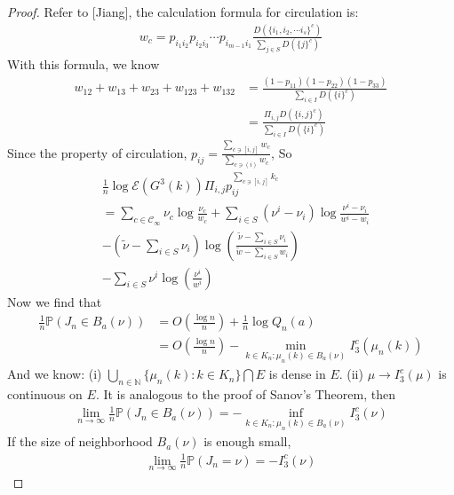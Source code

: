 \documentclass[11pt,en,cite=authoryear]{elegantpaper}
\begin{document}
\begin{proof}
    Refer to [Jiang], the calculation formula
    for circulation is:
    \begin{align*}
        w_c = p_{i_1 i_2} p_{i_2 i_3} \cdots p_{i_{m-1} i_1} \frac{D(\{i_1, i_2, \cdots i_s\}^c)}{\sum_{j\in S} D(\{j\}^c)}
    \end{align*}
    With this formula, we know
    \begin{align*}
        w_{12}+w_{13}+w_{23}+w_{123}+w_{132} &= \frac{(1-p_{11})(1-p_{22})(1-p_{33})}{\sum_{i\in I} D(\{i\}^c)} \\
        &= \frac{\Pi_{i, j} D(\{i, j\}^c)}{\sum_{i\in I} D(\{i\}^c)}
    \end{align*}
    Since the property of circulation, $p_{ij} = \frac{\sum_{c \ni [i,j]} w_c}{\sum_{c \ni (i)} w_c}$, So
    \begin{align*}
        &\frac{1}{n} \log \mathcal{E} (G^3(k)) \Pi_{i, j} p_{ij}^{\sum_{c \ni [i,j]} k_{c}} \\
        &= \sum_{c \in \mathcal{C}_{\infty}} \nu_{c} \log \frac{\nu_{c}}{w_c} + \sum_{i\in S}(\nu^i - \nu_i)\log \frac{\nu^i - \nu_i}{w^i - w_i} \\
        &-(\tilde{\nu} - \sum_{i\in S}\nu_i)\log(\frac{\tilde{\nu} - \sum_{i\in S}\nu_i}{\tilde{w} - \sum_{i\in S}w_i}) \\
        &-\sum_{i\in S} \nu^i \log (\frac{\nu^i}{w^i})
    \end{align*}
    Now we find that
    \begin{align*}
        \frac{1}{n} \mathbb{P}(J_n \in B_a(\nu))
        &= O(\frac{\log n}{n}) + \frac{1}{n} \log Q_n(a) \\
        &= O(\frac{\log n}{n}) - \min_{k \in K_n: \mu_n(k) \in B_a(\nu)} I_3^c(\mu_n(k))
    \end{align*}
    And we know:
    (i) $\bigcup_{n\in \mathbb{N}} \{\mu_n(k): k \in K_n\} \bigcap E$ is dense in $E$.
    (ii) $\mu \rightarrow I_3^c(\mu)$ is continuous on $E$.
    It is analogous to the proof of Sanov's Theorem, then
    \begin{align*}
        \lim_{n \rightarrow \infty} \frac{1}{n} \mathbb{P}(J_n \in B_a(\nu)) 
        = -\inf_{k \in K_n: \mu_n(k) \in B_a(\nu)} I_3^c(\nu)
    \end{align*}
    If the size of neighborhood $B_a(\nu)$ is enough small, 
    \begin{align*}
        \lim_{n \rightarrow \infty} \frac{1}{n} \mathbb{P}(J_n = \nu) 
        = - I_3^c(\nu)
    \end{align*}
\end{proof}
\end{document}
